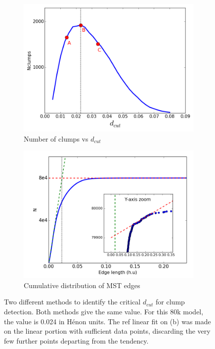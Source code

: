  
 \begin{figure}
\center
    \centering
    \begin{subfigure}[b]{0.49\textwidth}
    	\centering
    	\includegraphics[width=\textwidth]{Figures/1_Ndcut.png}
        \caption{Number of clumps vs $d_{cut}$}
        \label{Fig:1_Ndcut}
    \end{subfigure}
    \begin{subfigure}[b]{0.49\textwidth}
    	\centering
    	\includegraphics[width=\textwidth]{Figures/1_dcutdistribution.png}
        \caption{Cumulative distribution of MST edges}
        \label{Fig:1_dcutcumulated}
    \end{subfigure}
\caption{Two different methods to identify the critical $d_{cut}$ for clump detection. Both methods give the same value. For this 80k model, the value is 0.024 in H\'enon units. The ref linear fit on (b) was made on the linear portion with sufficient data points, discarding the very few further points departing from the tendency.}
\label{Fig:0_dcutchoice}
\end{figure}

